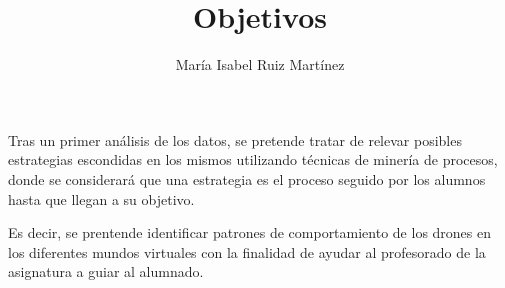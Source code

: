 \documentclass[10pt,a4paper]{article}
\author{María Isabel Ruiz Martínez}
\title{Objetivos}
\begin{document}
\maketitle

Tras un primer análisis de los datos, se pretende tratar de relevar posibles estrategias escondidas en los mismos utilizando técnicas de minería de procesos, donde se considerará que una estrategia es el proceso seguido por los alumnos hasta que llegan a su objetivo.

Es decir, se prentende identificar patrones de comportamiento de los drones en los diferentes mundos virtuales con la finalidad de ayudar al profesorado de la asignatura a guiar al alumnado.
\end{document}
